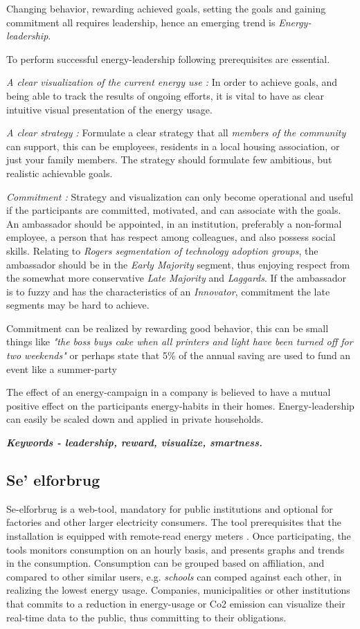 \documentclass[journal]{IEEEtran}
\begin{document}
Changing behavior, rewarding achieved goals, setting the goals and gaining commitment all requires leadership, hence an emerging trend is \textit{Energy-leadership}. 

To perform successful energy-leadership following prerequisites are essential.

\textit{A clear visualization of the current energy use :} In order to achieve goals, and being able to track the results of ongoing efforts, it is vital to have as clear intuitive visual presentation of the energy usage.
 
\textit{A clear strategy :} Formulate a clear strategy that all \textit{members of the community} can support, this can be employees, residents in a local housing association, or just your family members. The strategy should formulate few ambitious, but realistic achievable goals. 

\textit{Commitment :} Strategy and visualization can only become operational and useful if the participants are committed, motivated, and can associate with the goals. An ambassador should be appointed, in an institution, preferably a non-formal employee, a person that has respect among colleagues, and also possess social skills. Relating to \textit{Rogers segmentation of technology adoption groups}, the ambassador should be in the \textit{Early Majority} segment, thus enjoying respect from the somewhat more conservative \textit{Late Majority} and \textit{Laggards}. If the ambassador is to fuzzy and has the characteristics of an \textit{Innovator}, commitment the late segments may be hard to achieve. 

Commitment can be realized by rewarding good behavior, this can be small things like \textit{"the boss buys cake when all printers and light have been turned off for two weekends"} or perhaps state that 5\% of the annual saving are used to fund an event like a summer-party 

The effect of an energy-campaign in a company is believed to have a mutual positive effect on the participants energy-habits in their homes\cite{hidden_e}. Energy-leadership can easily be scaled down and applied in private households. \newline

\textbf{\textit{Keywords - leadership, reward, visualize, smartness.}}


\subsection{Se' elforbrug}
Se-elforbrug is a web-tool, mandatory for public institutions and optional for factories and other larger electricity consumers. The tool prerequisites that the installation is equipped with remote-read energy meters \cite{see}. 
Once participating, the tools monitors consumption on an hourly basis, and presents graphs and trends in the consumption. Consumption can be grouped based on affiliation, and compared to other similar users, e.g. \textit{schools} can comped against each other, in realizing the lowest energy usage.
Companies, municipalities or other institutions that commits to a reduction in energy-usage or Co2 emission can visualize their real-time data to the public, thus committing to their obligations.
\end{document}

